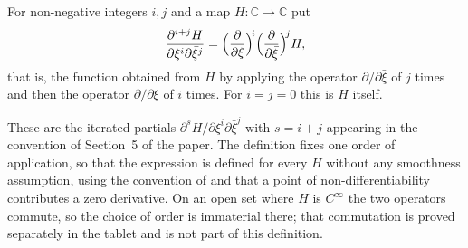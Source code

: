 \begin{definition}
For non-negative integers $i,j$ and a map $H\colon\mathbb{C}\to\mathbb{C}$ put
\[
  \frac{\partial^{i+j}H}{\partial\xi^i\partial\bar\xi^j}
  =\Bigl(\frac{\partial}{\partial\xi}\Bigr)^{\!i}
   \Bigl(\frac{\partial}{\partial\bar\xi}\Bigr)^{\!j}H,
\]
that is, the function obtained from $H$ by applying the operator
$\partial/\partial\bar\xi$ of  $j$ times and then the operator
$\partial/\partial\xi$ of  $i$ times.  For $i=j=0$ this is $H$
itself.

These are the iterated partials $\partial^sH/\partial\xi^i\partial\bar\xi^j$
with $s=i+j$ appearing in the convention of Section~5 of the paper.  The
definition fixes one order of application, so that the expression is defined
for every $H$ without any smoothness assumption, using the convention of
 and  that a point of non-differentiability
contributes a zero derivative.  On an open set where $H$ is $C^\infty$ the two
operators commute, so the choice of order is immaterial there; that
commutation is proved separately in the tablet and is not part of this
definition.
\end{definition}

